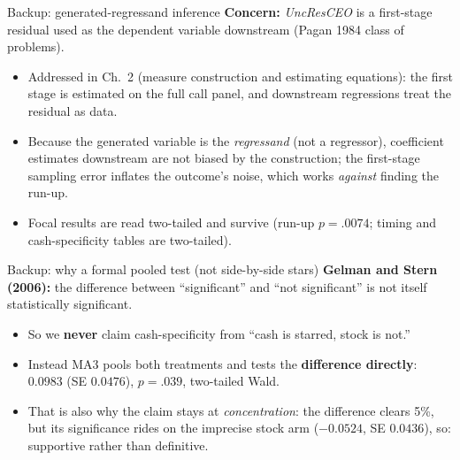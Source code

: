 \documentclass[aspectratio=169, 11pt]{beamer}
\begin{document}
\begin{frame}[noframenumbering]{Backup: generated-regressand inference}
  \textbf{Concern:} \textit{UncResCEO} is a first-stage residual used as the
  dependent variable downstream (Pagan 1984 class of problems).
  \vspace{0.5em}
  \begin{itemize}
    \item Addressed in Ch.\ 2 (measure construction and estimating equations):
      the first stage is estimated on the full call panel, and downstream
      regressions treat the residual as data.
    \item Because the generated variable is the \emph{regressand} (not a
      regressor), coefficient estimates downstream are not biased by the
      construction; the first-stage sampling error inflates the outcome's
      noise, which works \emph{against} finding the run-up.
    \item Focal results are read two-tailed and survive
      (run-up $p=.0074$; timing and cash-specificity tables are two-tailed).
  \end{itemize}
\end{frame}

\begin{frame}[noframenumbering]{Backup: why a formal pooled test (not side-by-side stars)}
  \textbf{Gelman and Stern (2006):} the difference between ``significant'' and
  ``not significant'' is not itself statistically significant.
  \vspace{0.5em}
  \begin{itemize}
    \item So we \textbf{never} claim cash-specificity from
      ``cash is starred, stock is not.''
    \item Instead MA3 pools both treatments and tests the
      \textbf{difference directly}: $0.0983$ (SE $0.0476$), $p=.039$,
      two-tailed Wald.
    \item That is also why the claim stays at \emph{concentration}:
      the difference clears 5\%, but its significance rides on the imprecise
      stock arm ($-0.0524$, SE $0.0436$), so: supportive rather than definitive.
  \end{itemize}
\end{frame}
\end{document}

